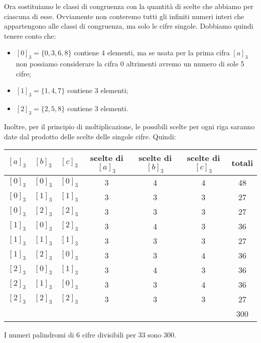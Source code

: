 \begin{soluzione}
    Ora sostituiamo le classi di congruenza con la quantità di scelte che abbiamo per ciascuna di esse.
    Ovviamente non conteremo tutti gli infiniti numeri interi che appartengono alle classi di congruenza, ma solo le
    cifre singole.
    Dobbiamo quindi tenere conto che:
    \begin{itemize}
        \item $[0]_3 = \{0, 3, 6, 8\}$ contiene 4 elementi, ma se usata per la prima cifra $[a]_3$ non possiamo
        considerare la cifra 0 altrimenti avremo un numero di sole 5 cifre;
        \item $[1]_3 = \{1, 4, 7\}$ contiene 3 elementi;
        \item $[2]_3 = \{2, 5, 8\}$ contiene 3 elementi.
    \end{itemize}

    Inoltre, per il principio di moltiplicazione, le possibili scelte per ogni riga saranno date dal prodotto delle
    scelte delle singole cifre.
    Quindi:

    \begin{table}[H]
        \label{tab:distrettuali_2019_2}
        \centering
        \begin{tabular}{ccccccc}
            \toprule
            $[a]_3$ & $[b]_3$ & $[c]_3$ & scelte di $[a]_3$ & scelte di $[b]_3$ & scelte di $[c]_3$ & totali \\
            \midrule
            $[0]_3$ & $[0]_3$ & $[0]_3$ & 3 & 4 & 4 & 48 \\
            $[0]_3$ & $[1]_3$ & $[1]_3$ & 3 & 3 & 3 & 27 \\
            $[0]_3$ & $[2]_3$ & $[2]_3$ & 3 & 3 & 3 & 27 \\
            $[1]_3$ & $[0]_3$ & $[2]_3$ & 3 & 4 & 3 & 36 \\
            $[1]_3$ & $[1]_3$ & $[1]_3$ & 3 & 3 & 3 & 27 \\
            $[1]_3$ & $[2]_3$ & $[0]_3$ & 3 & 3 & 4 & 36 \\
            $[2]_3$ & $[0]_3$ & $[1]_3$ & 3 & 4 & 3 & 36 \\
            $[2]_3$ & $[1]_3$ & $[0]_3$ & 3 & 3 & 4 & 36 \\
            $[2]_3$ & $[2]_3$ & $[2]_3$ & 3 & 3 & 3 & 27 \\
            \midrule
            & & & & & & 300 \\
            \bottomrule
        \end{tabular}
    \end{table}

    \bigskip
    I numeri palindromi di 6 cifre divisibili per 33 sono 300.
\end{soluzione}

